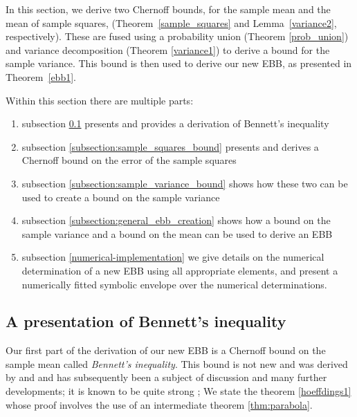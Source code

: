 
In this section, we derive two Chernoff bounds, for the sample mean and the mean of sample squares, (Theorem~\ref{sample_squares} and Lemma~\ref{variance2}, respectively). 
These are fused using a probability union (Theorem \ref{prob_union}) and variance decomposition (Theorem \ref{variance1}) to derive a bound for the sample variance. This bound is then used to derive our new EBB, as presented in Theorem~\ref{ebb1}.

Within this section there are multiple parts:
\begin{enumerate}
\item	subsection \ref{subsection:bennetts_inequality} presents and provides a derivation of Bennett's inequality
\item	subsection \ref{subsection:sample_squares_bound} presents and derives a Chernoff bound on the error of the sample squares
\item	subsection \ref{subsection:sample_variance_bound} shows how these two can be used to create a bound on the sample variance
\item	subsection \ref{subsection:general_ebb_creation} shows how a bound on the sample variance and a bound on the mean can be used to derive an EBB
\item	subsection \ref{numerical-implementation} we give details on the numerical determination of a new EBB using all appropriate elements, and present a numerically fitted symbolic envelope over the numerical determinations. 
\end{enumerate}


\subsection{A presentation of Bennett's inequality}\label{subsection:bennetts_inequality}

Our first part of the derivation of our new EBB is a Chernoff bound on the sample mean called \textit{Bennett's inequality}. 
This bound is not new and was derived by \cite{hoeffding1} and \cite{10.2307/2282438} and has subsequently been a subject of discussion and many further developments; it is known to be quite strong \cite{Bentkus08boundsfor,Pinelis2014,zbMATH00812598}; 
We state the theorem \ref{hoeffdings1} whose proof involves the use of an intermediate theorem \ref{thm:parabola}.

